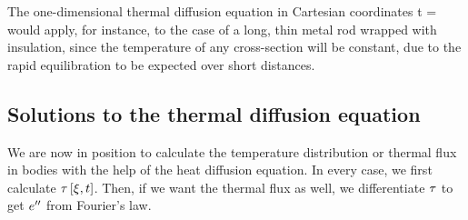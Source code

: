 The one-dimensional thermal diffusion equation in Cartesian coordinates
\beq
\cder\temp t = \kthdiff\cder{}
\eeq
would apply, for instance, to the case of a long, thin metal rod wrapped with insulation, since the temperature of any cross-section will be constant, due to the rapid equilibration to be expected over short distances.


\subsection{Solutions to the thermal diffusion equation}
We are now in position to calculate the temperature distribution or thermal flux in bodies with the help of the heat diffusion equation. In every case, we first calculate $\tau\left[{\xi, t}\right]$. Then, if we want the thermal flux as well, we differentiate $\tau$ to get ${e}^{\prime\prime}$ from Fourier's law.

